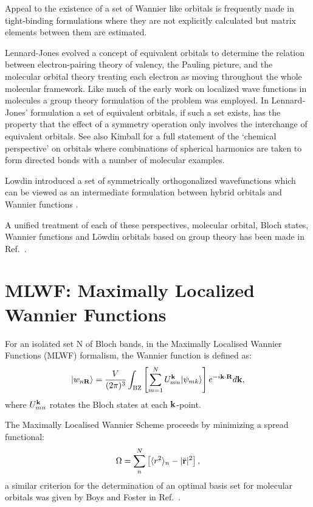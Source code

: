Appeal to the existence of a set of Wannier like orbitals is frequently made in
tight-binding formulations where they are not explicitly calculated but
matrix elements between them are estimated.

Lennard-Jones evolved a concept of equivalent 
orbitals \cite{lennardjones49a,lennardjones49b,hall50}
to determine the relation between electron-pairing theory of valency,
the Pauling picture, and the molecular orbital theory treating each
electron as moving throughout the whole molecular
framework. Like much of the early work on localized wave functions in molecules
a group theory formulation of the problem was employed.
In Lennard-Jones' formulation a set of equivalent orbitals, 
if such a set exists, has the property that the effect of a symmetry 
operation only involves the interchange of equivalent orbitals.
See also Kimball for a full statement of the `chemical perspective' 
on orbitals where combinations of spherical harmonics are taken to form
directed bonds \cite{kimball41} with a number of molecular examples.

Lowdin introduced a set of symmetrically orthogonalized wavefunctions which 
can be viewed as an intermediate formulation between hybrid orbitals 
and Wannier functions \cite{lowdin56}.

A unified treatment of each of these perspectives, molecular orbital,
Bloch states, Wannier functions and L\"owdin orbitals based on group theory 
has been made in Ref.~\cite{altmann58}.

\section{MLWF: Maximally Localized Wannier Functions}
For an isolated set N of Bloch bands, in the Maximally Localised Wannier Functions 
(MLWF) formalism, the Wannier function is defined as:
%
\begin{equation}
|w_{n{\bf R}}\rangle = \frac{V}{(2\pi)^{3}}\int_{\rm BZ} \left[ \sum_{m=1}^{N} U^{{\bf k}}_{mn}|\psi_{mk}\rangle \right]e^{-i{\bf k}\cdot{\bf R}}d{\bf k},
\end{equation}
%
where $U_{mn}^{{\bf k}}$ rotates the Bloch states at each ${\bf k}$-point.

The Maximally Localised Wannier Scheme proceeds by minimizing a spread functional:
%
\begin{equation}
\Omega = \sum_{n}^{N} \left[ \langle r^{2} \rangle_{n} - |\bar{{\bf r}}|^{2} \right],
\end{equation}
%
a similar criterion for the determination of an optimal basis set for
molecular orbitals was given by Boys and Foster in Ref.~\cite{boys60b}.

